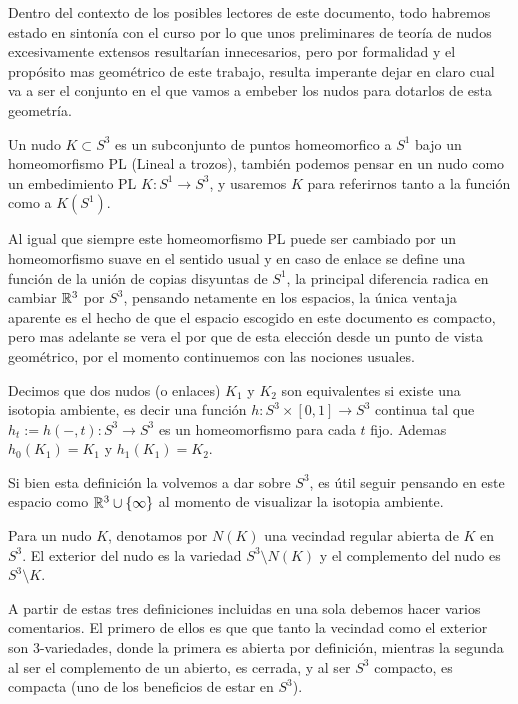 
Dentro del contexto de los posibles lectores de este documento, todo habremos estado en sintonía con el curso por lo que unos preliminares de teoría de nudos excesivamente extensos resultarían innecesarios, pero por formalidad y el propósito mas geométrico de este trabajo, resulta imperante dejar en claro cual va a ser el conjunto en el que vamos a embeber los nudos para dotarlos de esta geometría.

\begin{definition}
    Un nudo $K\subset S^3$ es un subconjunto de puntos homeomorfico a $S^1$ bajo un homeomorfismo PL (Lineal a trozos), también podemos pensar en un nudo como un embedimiento PL $K:S^1\to S^3$, y usaremos $K$ para referirnos tanto a la función como a $K(S^1)$.
\end{definition}

Al igual que siempre este homeomorfismo PL puede ser cambiado por un homeomorfismo suave en el sentido usual y en caso de enlace se define una función de la unión de copias disyuntas de $S^1$, la principal diferencia radica en cambiar $\mathbb{R}^3$ por $S^3$, pensando netamente en los espacios, la única ventaja aparente es el hecho de que el espacio escogido en este documento es compacto, pero mas adelante se vera el por que de esta elección desde un punto de vista geométrico, por el momento continuemos con las nociones usuales.

\begin{definition}
  Decimos que dos nudos (o enlaces) $K_1$ y $K_2$ son equivalentes si existe una isotopia ambiente, es decir una función $h:S^3\times [0,1]\to S^3$  continua  tal que $h_t:=h(-,t):S^3\to S^3$ es un homeomorfismo para cada $t$ fijo. Ademas $h_0(K_1)=K_1$ y $h_1(K_1)=K_2.$ 
\end{definition}

Si bien esta definición la volvemos a dar sobre $S^3$, es útil seguir pensando en este espacio como $\mathbb{R}^3\cup\{\infty\}$ al momento de visualizar la isotopia ambiente.

\begin{definition}
  Para un nudo $K$, denotamos por $N(K)$ una vecindad regular abierta de $K$ en $S^3$. El exterior del nudo es la variedad $S^3\setminus N(K)$ y el complemento del nudo es $S^3\setminus K.$
\end{definition}
A partir de estas tres definiciones incluidas en una sola debemos hacer varios comentarios. El primero de ellos es que  que tanto la vecindad como el exterior son 3-variedades, donde la primera es abierta por definición, mientras la segunda al ser el complemento de un abierto, es cerrada, y al ser $S^3$ compacto, es compacta (uno de los beneficios de estar en $S^3$).\\

